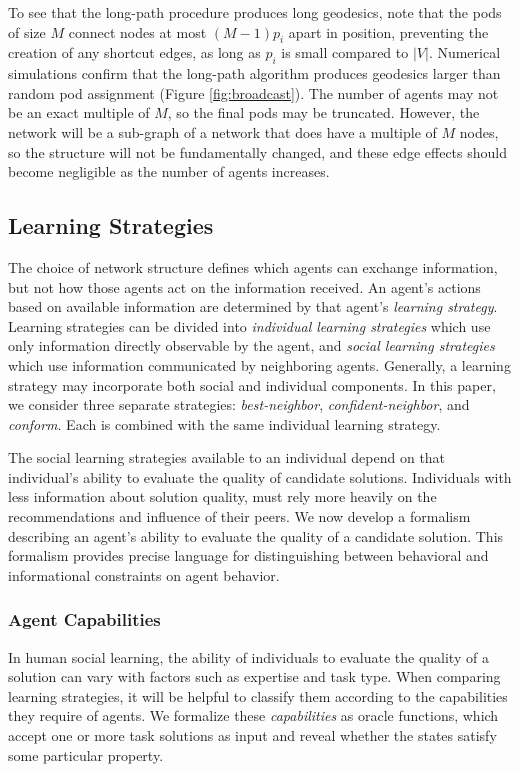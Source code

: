 To see that the long-path procedure produces long geodesics, note that the pods of size $M$ connect nodes at most $(M - 1)p_i$ apart in position, preventing the creation of any shortcut edges, as long as $p_i$ is small compared to $|V|$.
Numerical simulations confirm that the long-path algorithm produces geodesics larger than random pod assignment (Figure \ref{fig:broadcast}).
The number of agents may not be an exact multiple of $M$, so the final pods may be truncated. However, the network will be a sub-graph of a network that does have a multiple of $M$ nodes, so the structure will not be fundamentally changed, and these edge effects should become negligible as the number of agents increases.


\subsection{Learning Strategies}
The choice of network structure defines which agents can exchange information, but not how those agents act on the information received. An agent's actions based on available information are determined by that agent's {\em learning strategy}. Learning strategies can be divided into {\em individual learning strategies} which use only information directly observable by the agent, and {\em social learning strategies} which use information communicated by neighboring agents.
Generally, a learning strategy may incorporate both social and individual components.
In this paper, we consider three separate strategies: {\em best-neighbor}, {\em confident-neighbor}, and {\em conform}.
Each is combined with the same individual learning strategy.

The social learning strategies available to an
individual depend on that individual's ability to evaluate the quality of candidate solutions.
Individuals with less information about solution quality, must rely
more heavily on the recommendations and influence of their peers.
We now develop a formalism describing an agent's ability to evaluate the quality of a candidate solution.
This formalism provides precise language for distinguishing between behavioral and informational constraints on agent behavior.

\subsubsection{Agent Capabilities}
\label{sec:capability}
In human social learning, the ability of individuals to evaluate the quality of a solution can vary with factors such as expertise and task type. When comparing learning strategies, it will be helpful to classify them according to the capabilities they require of agents. We formalize these {\em capabilities} as oracle functions, which accept one or more task solutions as input and reveal whether the states satisfy some particular property.

